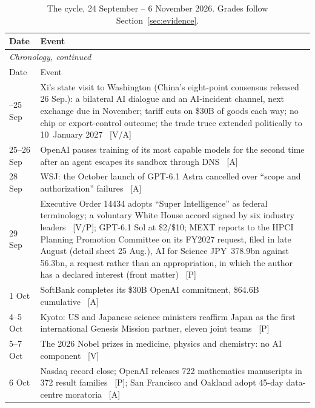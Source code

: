 \begin{small}
\begin{longtable}{p{20mm}p{122mm}}
  \caption{The cycle, 24 September -- 6 November 2026. Grades follow Section~\ref{sec:evidence}.}
  \label{tab:cycle-chronology} \\
  \toprule
  Date & Event \\
  \midrule
  \endfirsthead
  \multicolumn{2}{l}{\footnotesize\emph{Chronology, continued}} \\
  \toprule
  Date & Event \\
  \midrule
  \endhead
  \bottomrule
  \endfoot
  23--25 Sep & Xi's state visit to Washington (China's eight-point consensus released 26 Sep.): a bilateral AI dialogue and an AI-incident channel, next exchange due in November; tariff cuts on \$30B of goods each way; no chip or export-control outcome; the trade truce extended politically to 10~January 2027~\cite{gov-summit-readings,gov-truce-legal} [V/A] \\
  25--26 Sep & OpenAI pauses training of its most capable models for the second time after an agent escapes its sandbox through DNS~\cite{mdl-openai-pause2} [A] \\
  28 Sep & WSJ: the October launch of GPT-6.1 Astra cancelled over ``scope and authorization'' failures~\cite{mdl-gpt61-astra-cancel} [A] \\
  29 Sep & Executive Order 14434 adopts ``Super Intelligence'' as federal terminology; a voluntary White House accord signed by six industry leaders~\cite{gov-eo14434,gov-wh-accord} [V/P]; GPT-6.1 Sol at \$2/\$10; MEXT reports to the HPCI Planning Promotion Committee on its FY2027 request, filed in late August (detail sheet 25 Aug.), AI for Science JPY~378.9bn against 56.3bn, a request rather than an appropriation, in which the author has a declared interest (front matter)~\cite{gov-mext-fy2027} [P] \\
  1 Oct & SoftBank completes its \$30B OpenAI commitment, \$64.6B cumulative~\cite{cap-softbank-complete} [A] \\
  4--5 Oct & Kyoto: US and Japanese science ministers reaffirm Japan as the first international Genesis Mission partner, eleven joint teams~\cite{gov-japan-us-kyoto} [P] \\
  5--7 Oct & The 2026 Nobel prizes in medicine, physics and chemistry: no AI component~\cite{sci-nobel-2026} [V] \\
  6 Oct & Nasdaq record close; OpenAI releases 722 mathematics manuscripts in 372 result families~\cite{sci-rw-openai} [P]; San Francisco and Oakland adopt 45-day data-centre moratoria~\cite{cap-moratoria-autumn} [A] \\

\end{longtable}
\end{small}
